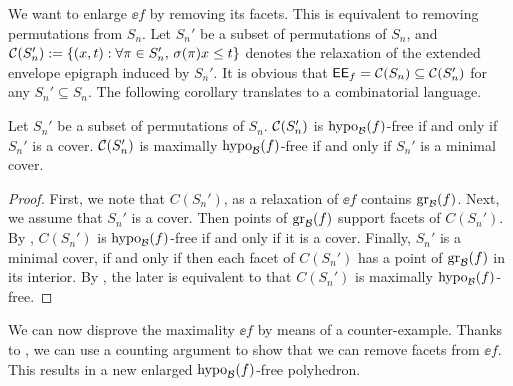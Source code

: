 We want to enlarge $\ee{f}$ by removing its facets. This is equivalent to removing permutations  from $S_n$.  Let  $S_n'$ be a subset  of permutations of $S_n$, and $\mathcal C(S_n') := \{(x,t): \forall \pi \in S_n', \, \sigma(\pi) x \le t\}$ denotes the relaxation of the extended envelope epigraph induced by $S_n'$. It is obvious that $\mathsf{EE}_{f}  = \mathcal C(S_n) \subseteq \mathcal C(S_n')$ for any $S_n' \subseteq S_n$. The following corollary translates  to a combinatorial language.
\begin{corollary}
\label{cor.permax}
Let $S_n'$ be a  subset  of permutations of $S_n$. $\mathcal C(S_n')$ is $\operatorname{hypo}_{\mathcal B}(f)$-free if and only if $S_n'$ is a cover. $\mathcal C(S_n')$ is maximally $\operatorname{hypo}_{\mathcal B}(f)$-free  if and only if $S_n'$ is a minimal cover.
\end{corollary}
\begin{proof}
First, we note that $C(S_n')$, as a relaxation of $\ee{f}$ contains $\operatorname{gr}_{\mathcal B}(f)$. Next, we assume  that $S_n'$ is a cover. Then  points of $\operatorname{gr}_{\mathcal B}(f)$ support facets of $C(S_n')$. By , $C(S_n')$ is $\operatorname{hypo}_{\mathcal B}(f)$-free if and only if it is a cover. Finally,  $S_n'$ is a minimal cover, if and only if then each facet of $C(S_n')$ has a point of $\operatorname{gr}_{\mathcal B}(f)$ in its interior. By , the later is equivalent to that $C(S_n')$ is  maximally $\operatorname{hypo}_{\mathcal B}(f)$-free.
\end{proof}



We can now disprove the maximality $\ee{f}$ by means of a counter-example. Thanks to , we can use a counting argument to show that we can remove facets from $\ee{f}$. This results in a new enlarged $\operatorname{hypo}_{\mathcal B}(f)$-free  polyhedron.
 
